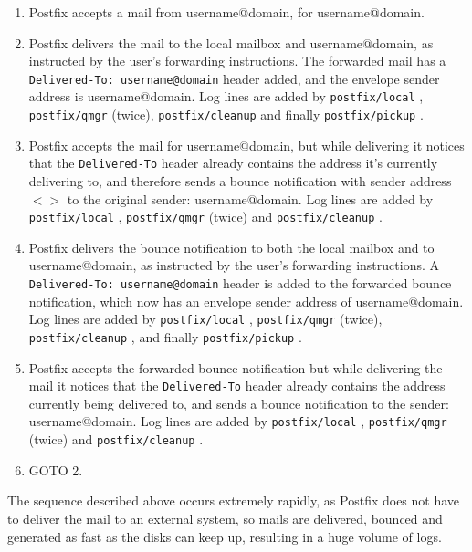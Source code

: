 \documentclass[a4paper,12pt,draft]{article}
\newcommand{\daemon}[1]{%
    \texttt{postfix/#1}%
}
\begin{document}
\begin{enumerate}

    \item Postfix accepts a mail from username@domain, for username@domain.

    \item Postfix delivers the mail to the local mailbox and
        username@domain, as instructed by the user's forwarding
        instructions. The forwarded mail has a
        \texttt{Delivered-To:~username@domain} header added, and the
        envelope sender address is username@domain.  Log lines are added by
        \daemon{local}, \daemon{qmgr} (twice), \daemon{cleanup} and finally
        \daemon{pickup}.

    \item Postfix accepts the mail for username@domain, but while
        delivering it notices that the \texttt{Delivered-To} header already
        contains the address it's currently delivering to, and therefore
        sends a bounce notification with sender address \textit{$<>$\/} to
        the original sender: username@domain.  Log lines are added by
        \daemon{local}, \daemon{qmgr} (twice) and \daemon{cleanup}.

    \item Postfix delivers the bounce notification to both the local
        mailbox and to username@domain, as instructed by the user's
        forwarding instructions.  A \texttt{Delivered-To:~username@domain}
        header is added to the forwarded bounce notification, which now has
        an envelope sender address of username@domain.  Log lines are added
        by \daemon{local}, \daemon{qmgr} (twice), \daemon{cleanup}, and
        finally \daemon{pickup}.

    \item Postfix accepts the forwarded bounce notification but while
        delivering the mail it notices that the \texttt{Delivered-To}
        header already contains the address currently being delivered to,
        and sends a bounce notification to the sender: username@domain.
        Log lines are added by \daemon{local}, \daemon{qmgr} (twice) and
        \daemon{cleanup}.

    \item GOTO 2.

\end{enumerate}

The sequence described above occurs extremely rapidly, as Postfix does not
have to deliver the mail to an external system, so mails are delivered,
bounced and generated as fast as the disks can keep up, resulting in a huge
volume of logs.
\end{document}
